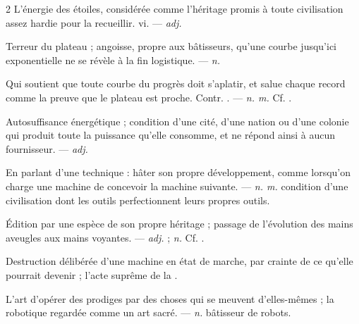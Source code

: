 \begin{multicols}{2}
 L'énergie des étoiles, considérée comme l'héritage promis à toute civilisation assez hardie pour la recueillir.   vi. —  \textit{adj.}

 Terreur du plateau ; angoisse, propre aux bâtisseurs, qu'une courbe jusqu'ici exponentielle ne se révèle à la fin logistique. —  \textit{n.}

 Qui soutient que toute courbe du progrès doit s'aplatir, et salue chaque record comme la preuve que le plateau est proche. Contr. . —  \textit{n. m.} Cf. .

 Autosuffisance énergétique ; condition d'une cité, d'une nation ou d'une colonie qui produit toute la puissance qu'elle consomme, et ne répond ainsi à aucun fournisseur. —  \textit{adj.}

 En parlant d'une technique : hâter son propre développement, comme lorsqu'on charge une machine de concevoir la machine suivante.  —  \textit{n. m.} condition d'une civilisation dont les outils perfectionnent leurs propres outils.

 Édition par une espèce de son propre héritage ; passage de l'évolution des mains aveugles aux mains voyantes. —  \textit{adj.} ;  \textit{n.} Cf. .

 Destruction délibérée d'une machine en état de marche, par crainte de ce qu'elle pourrait devenir ; l'acte suprême de la .

 L'art d'opérer des prodiges par des choses qui se meuvent d'elles-mêmes ; la robotique regardée comme un art sacré. —  \textit{n.} bâtisseur de robots.


\end{multicols}
